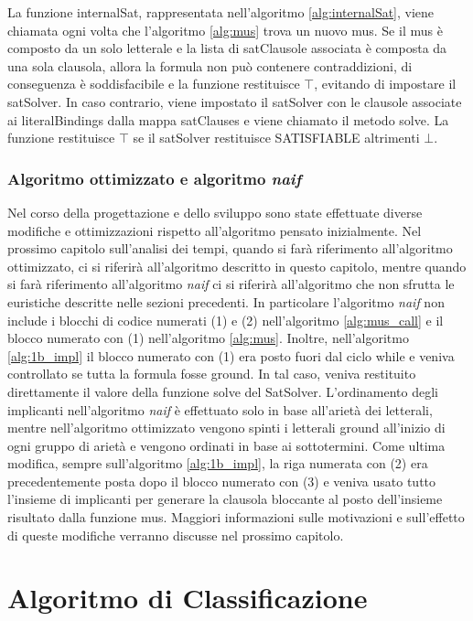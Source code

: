 \documentclass[./main.tex]{subfiles}
\begin{document}
La funzione internalSat, rappresentata nell'algoritmo \ref{alg:internalSat}, viene chiamata ogni volta che l'algoritmo \ref{alg:mus}
trova un nuovo mus. 
Se il mus è composto da un solo letterale e la lista di satClausole associata è composta 
da una sola clausola, allora la formula non può contenere contraddizioni, di conseguenza 
è soddisfacibile e la funzione restituisce $\top$, evitando di impostare il satSolver.
In caso contrario, viene impostato il satSolver con le clausole associate
ai literalBindings dalla mappa satClauses e viene chiamato il metodo solve.
La funzione restituisce $\top$ se il satSolver restituisce SATISFIABLE altrimenti $\bot$.

\subsubsection{Algoritmo ottimizzato e algoritmo \textit{naif}}

Nel corso della progettazione e dello sviluppo sono state effettuate diverse modifiche e ottimizzazioni 
rispetto all'algoritmo pensato inizialmente.
Nel prossimo capitolo sull'analisi dei tempi, quando si farà riferimento all'algoritmo ottimizzato, ci si riferirà 
all'algoritmo descritto in questo capitolo, mentre quando si farà riferimento all'algoritmo \textit{naif} ci si riferirà all'algoritmo
che non sfrutta le euristiche descritte nelle sezioni precedenti.
In particolare l'algoritmo \textit{naif} non include i blocchi di codice numerati (1) e (2) nell'algoritmo \ref{alg:mus_call} e
il blocco numerato con (1) nell'algoritmo \ref{alg:mus}.
Inoltre, nell'algoritmo \ref{alg:1b_impl} il blocco numerato con (1) era posto 
fuori dal ciclo while e veniva controllato se tutta la formula fosse ground.
In tal caso, veniva restituito direttamente il valore della funzione solve del SatSolver.
L'ordinamento degli implicanti nell'algoritmo \textit{naif} è effettuato solo in base all'arietà dei letterali, mentre nell'algoritmo ottimizzato
vengono spinti i letterali ground all'inizio di ogni gruppo di arietà e vengono ordinati in base ai sottotermini.
Come ultima modifica, sempre sull'algoritmo \ref{alg:1b_impl},
la riga numerata con (2) era precedentemente posta dopo il blocco numerato con (3)
e veniva usato tutto l'insieme di implicanti per generare la clausola bloccante
al posto dell'insieme risultato dalla funzione mus.
Maggiori informazioni sulle motivazioni e sull'effetto di queste modifiche verranno discusse nel prossimo capitolo.


\section{Algoritmo di Classificazione}  \label{sec:classifier}
\end{document}
